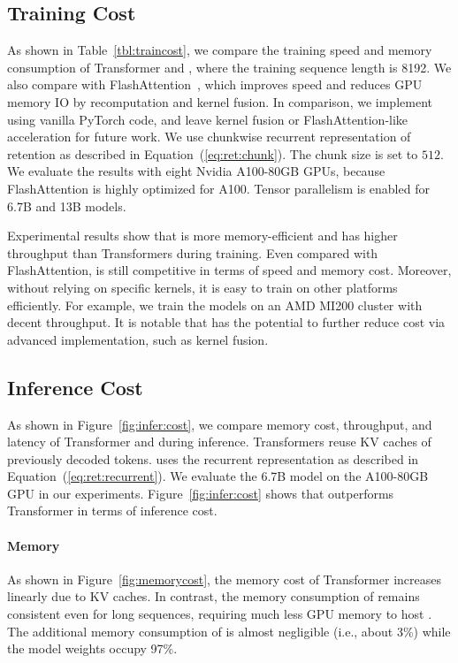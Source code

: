 \subsection{Training Cost}
\label{sec:training:cost}

As shown in Table~\ref{tbl:traincost}, we compare the training speed and memory consumption of Transformer and \our{}, where the training sequence length is 8192. We also compare with FlashAttention~\cite{flashattention}, which improves speed and reduces GPU memory IO by recomputation and kernel fusion. In comparison, we implement \our{} using vanilla PyTorch code, and leave kernel fusion or FlashAttention-like acceleration for future work. We use chunkwise recurrent representation of retention as described in Equation~(\ref{eq:ret:chunk}). The chunk size is set to $512$. We evaluate the results with eight Nvidia A100-80GB GPUs, because FlashAttention is highly optimized for A100. Tensor parallelism is enabled for 6.7B and 13B models.

Experimental results show that \our{} is more memory-efficient and has higher throughput than Transformers during training. Even compared with FlashAttention, \our{} is still competitive in terms of speed and memory cost. Moreover, without relying on specific kernels, it is easy to train \our{} on other platforms efficiently. For example, we train the \our{} models on an AMD MI200 cluster with decent throughput. It is notable that \our{} has the potential to further reduce cost via advanced implementation, such as kernel fusion.

\subsection{Inference Cost}
\label{sec:inference:cost}

As shown in Figure~\ref{fig:infer:cost}, we compare memory cost, throughput, and latency of Transformer and \our{} during inference. Transformers reuse KV caches of previously decoded tokens.
\our{} uses the recurrent representation as described in Equation~(\ref{eq:ret:recurrent}).
We evaluate the 6.7B model on the A100-80GB GPU in our experiments.
Figure~\ref{fig:infer:cost} shows that \our{} outperforms Transformer in terms of inference cost.

\paragraph{Memory}
As shown in Figure~\ref{fig:memorycost}, the memory cost of Transformer increases linearly due to KV caches. In contrast, the memory consumption of \our{} remains consistent even for long sequences, requiring much less GPU memory to host \our{}.
The additional memory consumption of \our{} is almost negligible (i.e., about 3\%) while the model weights occupy 97\%.

